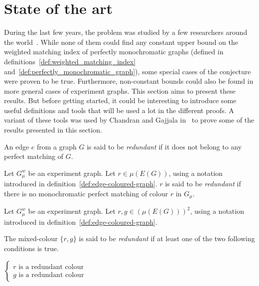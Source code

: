 \chapter{State of the art}
\label{ch:state-of-the-art}

During the last few years, the problem was studied by a few researchers around the world~\cite{Krenn_2017,bogdanov,chandran,chandran2023graphtheoretic}.
While none of them could find any constant upper bound on the weighted matching index of perfectly monochromatic graphs (defined in definitions~\ref{def:weighted_matching_index} and~\ref{def:perfectly_monochromatic_graph}), some special cases of the conjecture were proven to be true.
Furthermore, non-constant bounds could also be found in more general cases of experiment graphs.
This section aims to present these results.
But before getting started, it could be interesting to introduce some useful definitions and tools that will be used a lot in the different proofs.
A variant of these tools was used by Chandran and Gajjala in~\cite{chandran} to prove some of the results presented in this section.


\begin{definition}
    \label{def:redundant_edge}
    An edge $e$ from a graph $G$ is said to be \textit{redundant} if it does not belong to any perfect matching of $G$.
\end{definition}

\begin{definition}
    \label{def:redundant_colour}
    Let $G_\mu^w$ be an experiment graph.
    Let $r \in \mu\left(E(G)\right)$, using a notation introduced in definition~\ref{def:edge-coloured-graph}.
    $r$ is said to be \textit{redundant} if there is no monochromatic perfect matching of colour $r$ in $G_\mu$.
\end{definition}

\begin{definition}
    \label{def:redundant_mixed_colour}
    Let $G_\mu^w$ be an experiment graph.
    Let $r, g \in \left(\mu\left(E(G)\right)\right)^2$, using a notation introduced in definition~\ref{def:edge-coloured-graph}.

    The mixed-colour $\{r, g\}$ is said to be \textit{redundant} if at least one of the two following conditions is true.
    \begin{center}
        $\left\{
        \begin{array}{l}
            r \mbox{ is a redundant colour} \\
            g \mbox{ is a redundant colour}
        \end{array}
        \right.$
    \end{center}
\end{definition}

